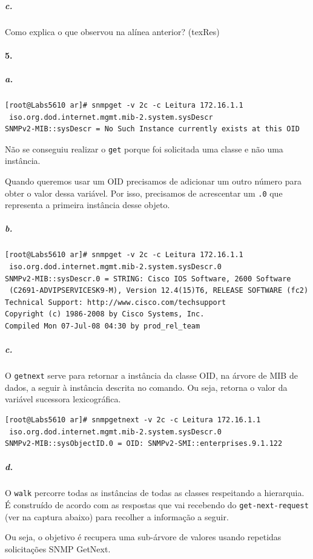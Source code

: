 \newpage

\subparagraph{c.}
Como explica o que observou na alínea anterior? (texRes)


\paragraph{5.}

\subparagraph{a.}
\begin{verbatim}
[root@Labs5610 ar]# snmpget -v 2c -c Leitura 172.16.1.1
 iso.org.dod.internet.mgmt.mib-2.system.sysDescr
SNMPv2-MIB::sysDescr = No Such Instance currently exists at this OID
\end{verbatim}

Não se conseguiu realizar o \texttt{get} porque foi solicitada uma classe e não uma instância.

Quando queremos usar um OID precisamos de adicionar um outro número para obter o valor dessa variável. Por isso, precisamos de acrescentar um \texttt{.0} que representa a primeira instância desse objeto.


\subparagraph{b.}
\begin{verbatim}
[root@Labs5610 ar]# snmpget -v 2c -c Leitura 172.16.1.1
 iso.org.dod.internet.mgmt.mib-2.system.sysDescr.0
SNMPv2-MIB::sysDescr.0 = STRING: Cisco IOS Software, 2600 Software
 (C2691-ADVIPSERVICESK9-M), Version 12.4(15)T6, RELEASE SOFTWARE (fc2)
Technical Support: http://www.cisco.com/techsupport
Copyright (c) 1986-2008 by Cisco Systems, Inc.
Compiled Mon 07-Jul-08 04:30 by prod_rel_team
\end{verbatim}


\subparagraph{c.}
O \texttt{getnext} serve para retornar a instância da classe OID, na árvore de MIB de dados, a seguir à instância descrita no comando. Ou seja, retorna o valor da variável sucessora lexicográfica.


\begin{verbatim}
[root@Labs5610 ar]# snmpgetnext -v 2c -c Leitura 172.16.1.1
 iso.org.dod.internet.mgmt.mib-2.system.sysDescr.0
SNMPv2-MIB::sysObjectID.0 = OID: SNMPv2-SMI::enterprises.9.1.122
\end{verbatim}


\subparagraph{d.}
O \texttt{walk} percorre todas as instâncias de todas as classes respeitando a hierarquia. É construído de  acordo com  as  respostas  que  vai  recebendo  do  \texttt{get-next-request} (ver  na captura abaixo) para recolher a informação a seguir.

Ou seja, o objetivo é recupera uma sub-árvore de valores usando repetidas solicitações SNMP GetNext.

